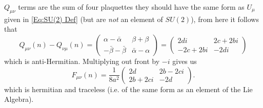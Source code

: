 	$Q_{\mu\nu}$ terms are the sum of four plaquettes they should have the same form as $U_\mu$ given in \cref{Eq:SU(2)
	Def} (but are \emph{not} an element of $SU(2)$), from here it follows that
	\begin{equation}\label{Eq:Diff_form}
		Q_{\mu\nu}(n)-Q_{\nu\mu}(n)=\begin{pmatrix}
		\alpha-\bar{\alpha} & \beta+\beta \\
		-\bar{\beta}-\bar{\beta} & \bar{\alpha}-\alpha \end{pmatrix}=
		\begin{pmatrix} 2di & 2c+2bi \\ -2c+2bi & -2di \end{pmatrix}
	\end{equation}
	which is anti-Hermitian. Multiplying out front by $-i$ gives us 
	\begin{equation}\label{Eq:Clov_Form}
		F_{\mu\nu}(n)=\frac{1}{8a^2}
		\begin{pmatrix} 2d & 2b-2ci \\ 2b+2ci & -2d \end{pmatrix}\text{.}
	\end{equation}
	which is hermitian and traceless (i.e. of the same form as an element of the Lie Algebra).
